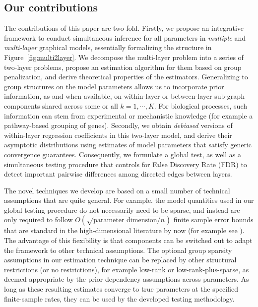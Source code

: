 \subsection{Our contributions}
The contributions of this paper are two-fold. Firstly, we propose an integrative framework to conduct simultaneous inference for all parameters in {\it multiple} and {\it multi-layer} graphical models, essentially formalizing the structure in Figure~\ref{fig:multi2layer}. We decompose the multi-layer problem into a series of two-layer problems, propose an estimation algorithm for them based on group penalization, and derive theoretical properties of the estimators. Generalizing to group structures on the model parameters allows us to incorporate prior information, as and when available, on within-layer or between-layer sub-graph components shared across some or all $k=1,\cdots,K$. For biological processes, such information can stem from experimental or mechanistic knowledge (for example a pathway-based grouping of genes). Secondly, we obtain {\em debiased} versions of within-layer regression coefficients in this two-layer model, and derive their asymptotic distributions using estimates of model parameters that satisfy generic convergence guarantees. Consequently, we formulate a global test, as well as a simultaneous testing procedure that controls for False Discovery Rate (FDR) to detect important pairwise differences among directed edges between layers.

{\colb
The novel techniques we develop are based on a small number of technical assumptions that are quite general. For example. the model quantities used in our global testing procedure do not necessarily need to be sparse, and instead are only required to follow $O(\sqrt{ \text{parameter dimension}/n})$ finite sample error bounds that are standard in the high-dimensional literature by now (for example see \citet{LohWainwright12, BasuMichailidis15, BasuEtal19}). The advantage of this %
fiexibility is that components can be switched out to adapt the framework to other technical assumptions. The optional group sparsity assumptions in our estimation technique can be replaced by other structural restrictions (or no restrictions), for example low-rank or low-rank-plus-sparse, as deemed appropriate by the prior dependency assumptions across parameters. As long as these resulting estimates converge to true parameters at the specified finite-sample rates, they can be used by the developed testing methodology.
}

